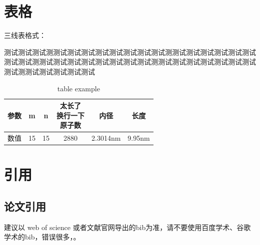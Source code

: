 \documentclass[AutoFakeBold]{LZUThesis}
\begin{document}
\section{表格}

三线表格式：

测试测试测试测测试测试测试测试测试测试测试测试测测试测试测试测试测试测试测试测试测测试测试测试测试测试测试测试测试测测试测试测试测试测试测试测试测试测测试测试测试测试测试


\begin{table}[hbt!]\label{tbl:mole}
    \centering
    \begin{tabular*}{0.9\textwidth}{@{\extracolsep{\fill}}cccccc}
        \toprule
        参数& m & n & \tabincell{c}{太长了\\换行一下\\原子数}  & 内径 & 长度\\
        \midrule
        数值 & 15 & 15  & 2880 & 2.3014nm & 9.95nm \\
        \bottomrule
    \end{tabular*}
    \caption{table example}
\end{table}


\section{引用}

\subsection{论文引用}

建议以 web of science 或者文献官网导出的bib为准，请不要使用百度学术、谷歌学术的bib，错误很多，\cite{partl2016, tenne1992polyhedral, tussyadiah2015hotels}。
\end{document}

